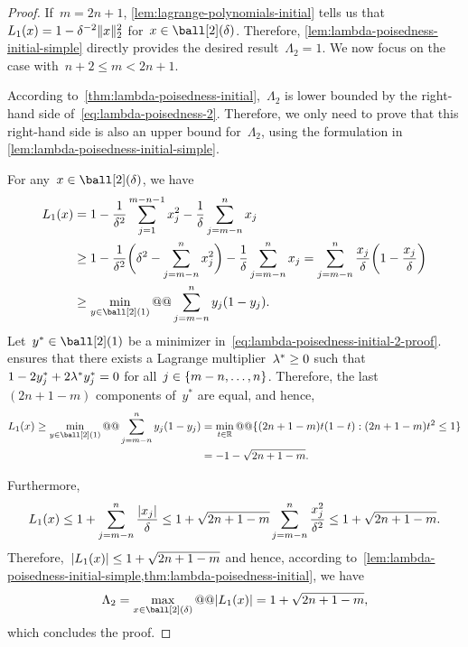 \begin{proof}
    If~$m = 2n + 1$, \cref{lem:lagrange-polynomials-initial} tells us that~$\lagp[1](\iter) = 1 - \delta^{-2} \norm{x}_2^2$ for~$\iter \in \ball[2](\delta)$.
    Therefore, \cref{lem:lambda-poisedness-initial-simple} directly provides the desired result~$\Lambda_2 = 1$.
    We now focus on the case with~$n + 2 \le m < 2n + 1$.

    According to~\cref{thm:lambda-poisedness-initial},~$\Lambda_2$ is lower bounded by the right-hand side of~\cref{eq:lambda-poisedness-2}.
    Therefore, we only need to prove that this right-hand side is also an upper bound for~$\Lambda_2$, using the formulation in \cref{lem:lambda-poisedness-initial-simple}.
    
    For any~$\iter \in \ball[2](\delta)$, we have
    \begin{subequations}
        \begin{align}
            \lagp[1](\iter) &= 1 - \frac{1}{\delta^2} \sum_{j = 1}^{m - n - 1} x_j^2 - \frac{1}{\delta} \sum_{j = m - n}^n x_j\\
                            &\ge 1 - \frac{1}{\delta^2} \bigg( \delta^2 - \sum_{j = m - n}^n x_j^2 \bigg) - \frac{1}{\delta} \sum_{j = m - n}^n x_j = \sum_{j = m - n}^n \frac{x_j}{\delta} \bigg( 1 - \frac{x_j}{\delta} \bigg)\\
                            &\ge \min_{y \in \ball[2](1)} @@ \sum_{j = m - n}^n y_j (1 - y_j). \label{eq:lambda-poisedness-initial-2-proof}
        \end{align}
    \end{subequations}
    Let~$y^{\ast} \in \ball[2](1)$ be a minimizer in~\cref{eq:lambda-poisedness-initial-2-proof}.
     ensures that there exists a Lagrange multiplier~$\lm[\ast] \ge 0$ such that~$1 - 2 y_j^{\ast} + 2 \lm[\ast] y_j^{\ast} = 0$ for all~$j \in \{m - n, \dots, n\}$.
    Therefore, the last~$(2n + 1 - m)$ components of~$y^{\ast}$ are equal, and hence,
    \begin{align*}
        \lagp[1](\iter) \ge \min_{y \in \ball[2](1)} @@ \sum_{j = m - n}^n y_j (1 - y_j)    &= \min_{t \in \R} @@ \set{(2n + 1 - m) t (1 - t) : (2n + 1 - m) t^2 \le 1}\\
                                                                                            &= -1 - \sqrt{2n + 1 - m}.
    \end{align*}

    Furthermore,
    \begin{equation*}
        \lagp[1](\iter) \le 1 + \sum_{j = m - n}^n \frac{\abs{x_j}}{\delta} \le 1 + \sqrt{2n + 1 - m} \sum_{j = m - n}^n \frac{x_j^2}{\delta^2} \le 1 + \sqrt{2n + 1 - m}.
    \end{equation*}
    Therefore,~$\abs{\lagp[1](\iter)} \le 1 + \sqrt{2n + 1 - m}$ and hence, according to~\cref{lem:lambda-poisedness-initial-simple,thm:lambda-poisedness-initial}, we have
    \begin{equation*}
        \Lambda_2 = \max_{\iter \in \ball[2](\delta)} @@ \abs{\lagp[1](\iter)} = 1 + \sqrt{2n + 1 - m},
    \end{equation*}
    which concludes the proof.
\end{proof}

